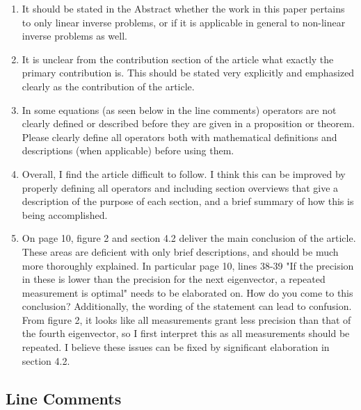 \documentclass{amsart}
\begin{document}
\begin{enumerate}
\item It should be stated in the Abstract whether the work in this
  paper pertains to only linear inverse problems, or if it is
  applicable in general to non-linear inverse problems as well.
  
\item It is unclear from the contribution section of the article what
exactly the primary contribution is. This should be stated very
explicitly and emphasized clearly as the contribution of the article.

\item In some equations (as seen below in the line comments) operators
are not clearly defined or described before they are given in a
proposition or theorem. Please clearly define all operators both with
mathematical definitions and descriptions (when applicable) before
using them.

\item Overall, I find the article difficult to follow. I think this can
be improved by properly defining all operators and including section
overviews that give a description of the purpose of each section, and
a brief summary of how this is being accomplished.


\item On page 10, figure 2 and section 4.2 deliver the main conclusion of
the article. These areas are deficient with only brief descriptions,
and should be much more thoroughly explained. In particular page 10,
lines 38-39 "If the precision in these is lower than the precision for
the next eigenvector, a repeated measurement is optimal" needs to be
elaborated on. How do you come to this conclusion? Additionally, the
wording of the statement can lead to confusion. From figure 2, it
looks like all measurements grant less precision than that of the
fourth eigenvector, so I first interpret this as all measurements
should be repeated. I believe these issues can be fixed by significant
elaboration in section 4.2.
\end{enumerate}


\subsection{Line Comments}
\end{document}
